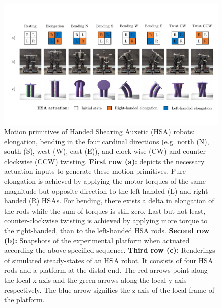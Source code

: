 \begin{figure}[hbt]
    \centering
    \includegraphics[width=1.0\textwidth]{hsamodel/figures/motion_primitives/motion_primitives_v2_compressed.pdf}
    
    \caption{Motion primitives of Handed Shearing Auxetic (HSA) robots: elongation, bending in the four cardinal directions (e.g. north (N), south (S), west (W), east (E)), and clock-wise (CW) and counter-clockwise (CCW) twisting.
    \textbf{First row (a):} depicts the necessary actuation inputs to generate these motion primitives. Pure elongation is achieved by applying the motor torques of the same magnitude but opposite direction to the left-handed (L) and right-handed (R) HSAs. For bending, there exists a delta in elongation of the rods while the sum of torques is still zero. Last but not least, counter-clockwise twisting is achieved by applying more torque to the right-handed, than to the left-handed HSA rods.
    \textbf{Second row (b):} Snapshots of the experimental platform when actuated according the above specified sequence.
    \textbf{Third row (c):} Renderings of simulated steady-states of an HSA robot. It consists of four HSA rods and a platform at the distal end. The red arrows point along the local x-axis and the green arrows along the local y-axis respectively. The blue arrow signifies the z-axis of the local frame of the platform.}\label{fig:hsamodel:motion_primitives}
\end{figure}

%
%
%


